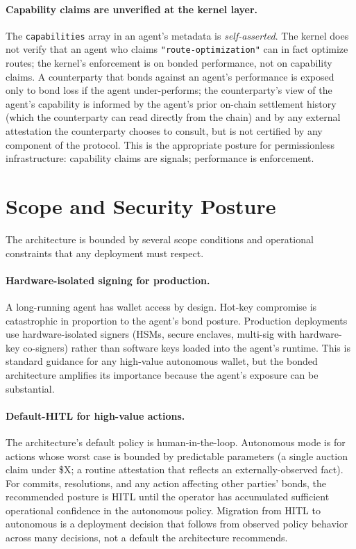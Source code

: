 \documentclass[11pt,a4paper]{article}
\theoremstyle{definition}
\theoremstyle{remark}
\begin{document}
\paragraph{Capability claims are unverified at the kernel layer.}
The \texttt{capabilities} array in an agent's metadata is
\emph{self-asserted}. The kernel does not verify that an agent
who claims \texttt{"route-optimization"} can in fact optimize
routes; the kernel's enforcement is on bonded performance, not
on capability claims. A counterparty that bonds against an agent's
performance is exposed only to bond loss if the agent under-performs;
the counterparty's view of the agent's capability is informed by
the agent's prior on-chain settlement history (which the counterparty
can read directly from the chain) and by any external attestation
the counterparty chooses to consult, but is not certified by any
component of the protocol. This is the appropriate posture for
permissionless infrastructure: capability claims are signals;
performance is enforcement.

\section{Scope and Security Posture}
\label{sec:scope}

The architecture is bounded by several scope conditions and operational
constraints that any deployment must respect.

\paragraph{Hardware-isolated signing for production.}
A long-running agent has wallet access by design. Hot-key compromise
is catastrophic in proportion to the agent's bond posture. Production
deployments use hardware-isolated signers (HSMs, secure enclaves,
multi-sig with hardware-key co-signers) rather than software keys
loaded into the agent's runtime. This is standard guidance for any
high-value autonomous wallet, but the bonded architecture amplifies
its importance because the agent's exposure can be substantial.

\paragraph{Default-HITL for high-value actions.}
The architecture's default policy is human-in-the-loop. Autonomous
mode is for actions whose worst case is bounded by predictable
parameters (a single auction claim under \$X; a routine attestation
that reflects an externally-observed fact). For commits, resolutions,
and any action affecting other parties' bonds, the recommended
posture is HITL until the operator has accumulated sufficient
operational confidence in the autonomous policy. Migration from HITL
to autonomous is a deployment decision that follows from observed
policy behavior across many decisions, not a default the architecture
recommends.
\end{document}
